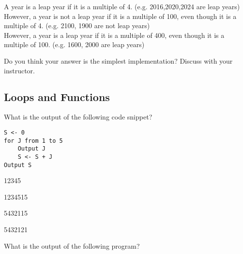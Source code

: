 \begin{questions}
A year is a leap year if it is a multiple of 4. (e.g. 2016,2020,2024 are leap years) \\
However, a year is not a leap year if it is a multiple of 100, even though it is a multiple of 4. (e.g. 2100, 1900 are not leap years) \\
However, a year is a leap year if it is a multiple of 400, even though it is a multiple of 100. (e.g. 1600, 2000 are leap years)

Do you think your answer is the simplest implementation? Discuss with your instructor.

\subsection*{Loops and Functions}
 What is the output of the following code snippet?


\begin{lstlisting}
S <- 0
for J from 1 to 5
    Output J
    S <- S + J
Output S
\end{lstlisting}

\begin{multiplechoice}
\item 12345
\item 1234515
\item 5432115
\item 5432121
\end{multiplechoice}

\label{q:dse:2016p1:q31}


 What is the output of the following program?


\end{questions}
